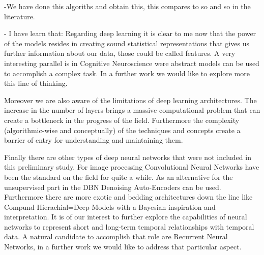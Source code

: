 \documentclass[11pt,a4paper]{article}
\begin{document}
-We have done this algoriths and obtain this, this compares to so and so in the literature.

- I have learn that: 
Regarding deep learning it is clear to me now that the power of the models resides in creating sound statistical representations that gives us further information about our data, those could be called features. A very interesting parallel is in Cognitive Neuroscience were abstract models can be used to accomplish a complex task. In a further work we would like to explore more this line of thinking. 

Moreover we are also aware of the limitations of deep learning architectures. The increase in the number of layers brings a massive computational problem that can create a bottleneck in the progress of the field. Furthermore the complexity (algorithmic-wise and conceptually) of the techniques and concepts create a barrier of entry for understanding and maintaining them.

Finally there are other types of deep neural networks that were not included in this preliminary study.  For image processing Convolutional Neural Networks have been the standard on the field for quite a while. As an alternative for the unsupervised part in the DBN Denoising Auto-Encoders can be used. Furthermore there are more exotic and bedding architectures down the line like Compund Hierachial=Deep Models with a Bayesian inspiration and interpretation. It is of our interest to further explore the capabilities of neural networks to represent short and long-term temporal relationships with temporal data. A natural candidate to accomplish that role are Recurrent Neural Networks, in a further work we would like to address that particular aspect.



\end{document}
